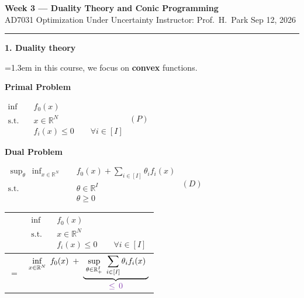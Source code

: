 \documentclass[10pt]{article}
\newcommand{\beat}[2]{%
  \par\bigskip\vspace{4pt}
  {\color{ruleink}\rule{\textwidth}{1pt}}\par\nobreak\vspace{4pt}
  {\large\bfseries #1.\; #2}\par\nobreak\vspace{6pt}}
\newenvironment{board}{%
  \par\vspace{4pt}
  \begingroup\leftskip=1.3em\relax\parskip=2pt\relax}{%
  \par\endgroup\vspace{4pt}}
\begin{document}
{\Large\bfseries Week 3 --- Duality Theory and Conic Programming}\\[2pt]
{\small AD7031 Optimization Under Uncertainty \quad\textbullet\quad Instructor: Prof.\ H.\ Park \quad\textbullet\quad Sep 12, 2026}

\beat{1}{Duality theory}
\begin{board}
in this course, we focus on \textbf{convex} functions.
\vspace{10pt}

\textbf{Primal Problem}
\vspace{2pt}

\begin{center}
$\begin{aligned}
  \inf\quad & f_0(x) \\
  \text{s.t.}\quad & x \in \mathbb{R}^N \\
                   & f_i(x) \le 0 \qquad \forall i \in [I]
\end{aligned}$
\hspace{4.5cm} $(P)$
\end{center}
\vspace{10pt}

\textbf{Dual Problem}
\vspace{2pt}

\begin{center}
$\begin{aligned}
  \sup_{\theta}\ \inf_{x \in \mathbb{R}^N}\quad & f_0(x) + \sum_{i \in [I]} \theta_i f_i(x) \\
  \text{s.t.}\quad & \theta \in \mathbb{R}^I \\
                   & \theta \ge 0
\end{aligned}$
\hspace{4.0cm} $(D)$
\end{center}
\vspace{12pt}

\begin{center}
{\setlength{\arrayrulewidth}{1pt}
\begin{tabular}{|@{\;}c@{\;\;}l@{\;}|}
\hline
\rule{0pt}{4.6em}
 & \color{redink}$\begin{aligned}
      \inf\quad & f_0(x) \\
      \text{s.t.}\quad & x \in \mathbb{R}^N \\
                       & f_i(x) \le 0 \qquad \forall i \in [I]
   \end{aligned}$ \\[1.4em]
\hline
\rule{0pt}{3.6em}
\color{redink}$=$ &
 \color{redink}$\displaystyle \inf_{x \in \mathbb{R}^N}\ f_0(x)
   \;+\; \underbrace{\ \sup_{\theta \in \mathbb{R}^I_+}\ \sum_{i \in [I]} \theta_i f_i(x)\ }_{\textstyle \color{purpink}\le\, 0}$ \\[2.6em]
\hline
\end{tabular}}
\end{center}
\vspace{4pt}


\end{board}
\end{document}
